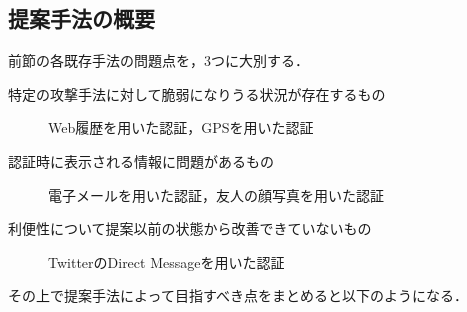 
\subsection{提案手法の概要}
前節の各既存手法の問題点を，3つに大別する．
\begin{description}
  \item[特定の攻撃手法に対して脆弱になりうる状況が存在するもの] Web履歴を用いた認証，GPSを用いた認証
  \item[認証時に表示される情報に問題があるもの] 電子メールを用いた認証，友人の顔写真を用いた認証
  \item[利便性について提案以前の状態から改善できていないもの] TwitterのDirect Messageを用いた認証
\end{description}

その上で提案手法によって目指すべき点をまとめると以下のようになる．

